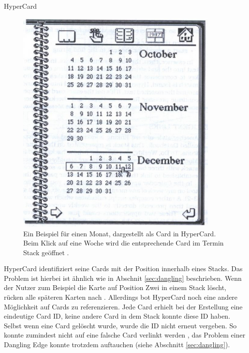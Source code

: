 \begin{section}{HyperCard}
\begin{figure}[H]
	\centering
	\includegraphics[width=0.9\textwidth]{image/hypercardLink}
	\caption{Ein Beispiel für einen Monat, dargestellt als Card in HyperCard. Beim Klick auf eine Woche wird die entsprechende Card im Termin Stack geöffnet \cite{Goodman1988}.}
	\label{fig:hypercardLink}
\end{figure}

HyperCard identifiziert seine Cards mit der Position innerhalb eines Stacks. Das Problem ist hierbei ist ähnlich wie in Abschnit \ref{sec:dangling} beschrieben. Wenn der Nutzer zum Beispiel die Karte auf Position Zwei in einem Stack löscht, rücken alle späteren Karten nach \cite{Goodman1988}. Allerdings bot HyperCard noch eine andere Möglichkeit auf Cards zu referenzieren. Jede Card erhielt bei der Erstellung eine eindeutige Card ID, keine andere Card in dem Stack konnte diese ID haben. Selbst wenn eine Card gelöscht wurde, wurde die ID nicht erneut vergeben. So konnte zumindest nicht auf eine falsche Card verlinkt werden \cite{Goodman1988}, das Problem einer Dangling Edge konnte trotzdem auftauchen (siehe Abschnitt \ref{sec:dangling}).

\end{section}

